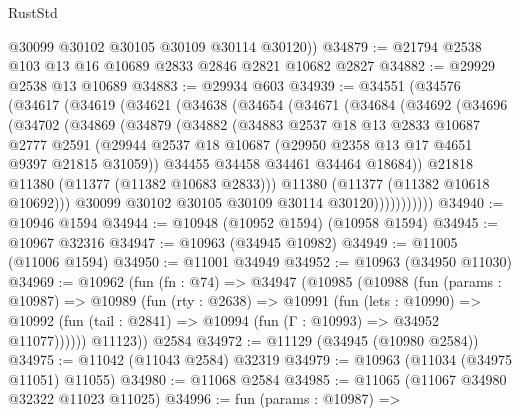 \begin{lexlean}{RustStd}
\begin{coremodule}
        @30099
        @30102
        @30105
        @30109
        @30114
        @30120))
@34879 := @21794 @2538 @103 @13 @16 @10689 @2833 @2846 @2821 @10682 @2827
@34882 := @29929 @2538 @13 @10689
@34883 := @29934 @603
@34939 := @34551
    (@34576
      (@34617
        (@34619
          (@34621
            (@34638
              (@34654
                (@34671
                  (@34684
                    (@34692
                      (@34696
                        (@34702
                          (@34869
                            (@34879
                              (@34882
                                (@34883
                                  @2537
                                  @18
                                  @13
                                  @2833
                                  @10687
                                  @2777
                                  @2591
                                  (@29944
                                    @2537
                                    @18
                                    @10687
                                    (@29950 @2358 @13 @17 @4651 @9397 @21815 @31059))
                                  @34455
                                  @34458
                                  @34461
                                  @34464
                                  @18684))
                              @21818
                              @11380
                              (@11377 (@11382 @10683 @2833)))
                            @11380
                            (@11377 (@11382 @10618 @10692)))
                          @30099
                          @30102
                          @30105
                          @30109
                          @30114
                          @30120)))))))))))
@34940 := @10946 @1594
@34944 := @10948 (@10952 @1594) (@10958 @1594)
@34945 := @10967 @32316
@34947 := @10963 (@34945 @10982)
@34949 := @11005 (@11006 @1594)
@34950 := @11001 @34949
@34952 := @10963 (@34950 @11030)
@34969 := @10962
    (fun (fn : @74) =>
    @34947
      (@10985
        (@10988
          (fun (params : @10987) =>
          @10989
            (fun (rty : @2638) =>
            @10991
              (fun (lets : @10990) =>
              @10992 (fun (tail : @2841) => @10994 (fun (Γ : @10993) => @34952 @11077))))))
        @11123))
    @2584
@34972 := @11129 (@34945 (@10980 @2584))
@34975 := @11042 (@11043 @2584) @32319
@34979 := @10963 (@11034 (@34975 @11051) @11055)
@34980 := @11068 @2584
@34985 := @11065 (@11067 @34980 @32322 @11023 @11025)
@34996 := fun (params : @10987) =>

\end{coremodule}
\end{lexlean}
